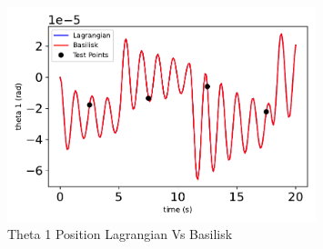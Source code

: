 \begin{figure}[htbp]\centerline{\includegraphics[width=0.8\textwidth]{AutoTeX/Theta1LagrangianVsBasilisk}}\caption{Theta 1 Position Lagrangian Vs Basilisk}\label{fig:Theta1LagrangianVsBasilisk}\end{figure}